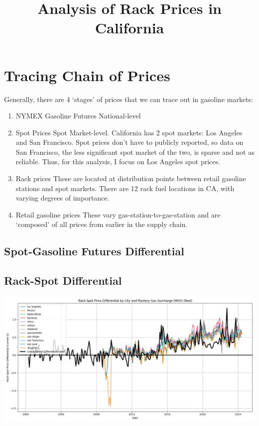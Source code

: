 \documentclass{article}
\begin{document}
\title{Analysis of Rack Prices in California} 

\maketitle

\section{Tracing Chain of Prices}

Generally, there are 4 `stages' of prices that we can trace out in gasoline markets: 
\begin{enumerate} 
	\item NYMEX Gasoline Futures
		\subitem National-level
	\item Spot Prices 
		\subitem Spot Market-level. California has 2 spot markets: Los Angeles and San Francisco. Spot prices don't have to publicly reported, so data on San Francisco, the less significant spot market of the two, is sparse and not as reliable. Thus, for this analysis, I focus on Los Angeles spot prices. 
	\item Rack prices 
		\subitem These are located at distribution points between retail gasoline stations and spot markets. There are 12 rack fuel locations in CA, with varying degrees of importance. 
	\item Retail gasoline prices
		\subitem These vary gas-station-to-gas-station and are `composed' of all prices from earlier in the supply chain.
\end{enumerate}

\subsection{Spot-Gasoline Futures Differential}


\subsection{Rack-Spot Differential}
\includegraphics[width=7in]{rack_spot_differentials.png}
\end{document}
